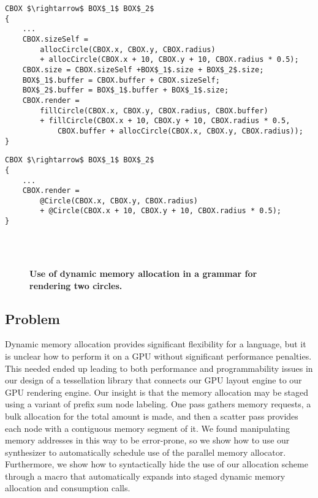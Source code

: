 \newsavebox{\twocirclesExpanded}
\begin{lrbox}{\twocirclesExpanded}%
\begin{lstlisting}[mathescape]
CBOX $\rightarrow$ BOX$_1$ BOX$_2$
{
	...
	CBOX.sizeSelf = 
		allocCircle(CBOX.x, CBOX.y, CBOX.radius)
		+ allocCircle(CBOX.x + 10, CBOX.y + 10, CBOX.radius * 0.5);
	CBOX.size = CBOX.sizeSelf +BOX$_1$.size + BOX$_2$.size;
	BOX$_1$.buffer = CBOX.buffer + CBOX.sizeSelf;
	BOX$_2$.buffer = BOX$_1$.buffer + BOX$_1$.size;
	CBOX.render = 
		fillCircle(CBOX.x, CBOX.y, CBOX.radius, CBOX.buffer)
		+ fillCircle(CBOX.x + 10, CBOX.y + 10, CBOX.radius * 0.5,
			CBOX.buffer + allocCircle(CBOX.x, CBOX.y, CBOX.radius));
}
\end{lstlisting}
\end{lrbox}

\newsavebox{\twocirclesMacro}
\begin{lrbox}{\twocirclesMacro}%
\begin{lstlisting}[mathescape]
CBOX $\rightarrow$ BOX$_1$ BOX$_2$
{
	...
	CBOX.render = 
		@Circle(CBOX.x, CBOX.y, CBOX.radius)
		+ @Circle(CBOX.x + 10, CBOX.y + 10, CBOX.radius * 0.5);
}
\end{lstlisting}
\end{lrbox}




\begin{figure}
  \\
  \\
\caption{\textbf{Use of dynamic memory allocation in a grammar for rendering two circles.}}
\label{fig:stagedallocClient}
\end{figure}

\subsection{Problem}
Dynamic memory allocation provides significant flexibility for a language, but it is unclear how to perform it on a GPU without significant performance penalties. This needed ended up leading to both performance and programmability issues in our design of a tessellation library that connects our GPU layout engine to our GPU rendering engine. Our insight is that the memory allocation may be staged using a variant of prefix sum node labeling. One pass gathers  memory requests, a bulk allocation for the total amount is made, and then a scatter pass provides each node with a contiguous memory segment of it. We found manipulating memory addresses in this way to be error-prone, so we show how to use our synthesizer to automatically schedule use of the parallel memory allocator. Furthermore, we show how to syntactically hide the use of our allocation scheme through a macro that automatically expands into staged dynamic memory allocation and consumption calls.

